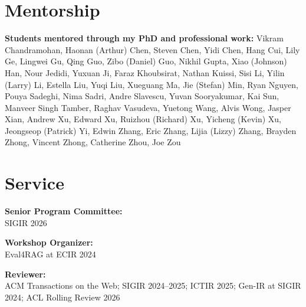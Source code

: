 \documentclass[letterpaper,12pt]{article}
\begin{document}
\section{Mentorship}
  \textbf{Students mentored through my PhD and professional work:} Vikram Chandramohan, Haonan (Arthur) Chen, Steven Chen, Yidi Chen, Hang Cui, Lily Ge, Lingwei Gu, Qing Guo, Zibo (Daniel) Guo, Nikhil Gupta, Xiao (Johnson) Han, Nour Jedidi, Yuxuan Ji, Faraz Khoubsirat, Nathan Kuissi, Sisi Li, Yilin (Larry) Li, Estella Liu, Yuqi Liu, Xueguang Ma, Jie (Stefan) Min, Ryan Nguyen, Pouya Sadeghi, Nima Sadri, Andre Slavescu, Yuvan Sooryakumar, Kai Sun, Manveer Singh Tamber, Raghav Vasudeva, Yuetong Wang, Alvis Wong, Jasper Xian, Andrew Xu, Edward Xu, Ruizhou (Richard) Xu, Yicheng (Kevin) Xu, Jeongseop (Patrick) Yi, Edwin Zhang, Eric Zhang, Lijia (Lizzy) Zhang, Brayden Zhong, Vincent Zhong, Catherine Zhou, Joe Zou

  \vspace{-6pt}

\section{Service}

\textbf{Senior Program Committee:}\\
SIGIR 2026

\textbf{Workshop Organizer:}\\
Eval4RAG at ECIR 2024

\textbf{Reviewer:}\\
ACM Transactions on the Web; SIGIR 2024--2025; ICTIR 2025; Gen-IR at SIGIR 2024; ACL Rolling Review 2026
\end{document}
